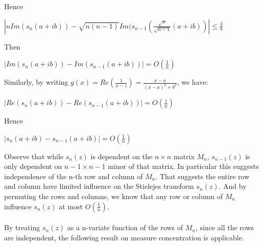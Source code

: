 \documentclass{article}
\begin{document}
Hence
\begin{center}
    $\left|nIm(s_n(a + ib)) - \sqrt{n(n-1)}Im(s_{n-1} \left(\frac{\sqrt{n}}{\sqrt{n - 1}}(a+ib)\right)\right| \leq \frac{3}{b}$
\end{center}
Then
\begin{center}
    $\left|Im(s_n(a + ib)) - Im(s_{n-1}(a+ib))\right| = O\left(\frac{1}{n}\right)$
\end{center}
Similarly, by writing $g(x) = Re\left(\frac{1}{x - z}\right) = \frac{x-a}{(x-a)^2 + b^2}$, we have:
\begin{center}
    $\left|Re(s_n(a + ib)) - Re(s_{n-1}(a+ib))\right| = O\left(\frac{1}{n}\right)$
\end{center}
Hence
\begin{center}
    $\left|s_n(a + ib) - s_{n-1}(a+ib)\right| = O\left(\frac{1}{n}\right)$
\end{center}
Observe that while $s_n(z)$ is dependent on the $n\times n$ matrix $M_n$, $s_{n-1}(z)$ is only dependent on $n-1 \times n-1$ minor of that matrix. In particular this suggests independence of the n-th row and column of $M_n$. That suggests the entire row and column have limited influence on the Stielejes transform $s_n(z)$. And by permuting the rows and columns, we know that any row or column of $M_n$ influence $s_n(z)$ at most $O\left(\frac{1}{n}\right)$.\\
\\
By treating $s_n(z)$ as a n-variate function of the rows of $M_n$, since all the rows are independent, the following result on measure concentration is applicable.
\end{document}
